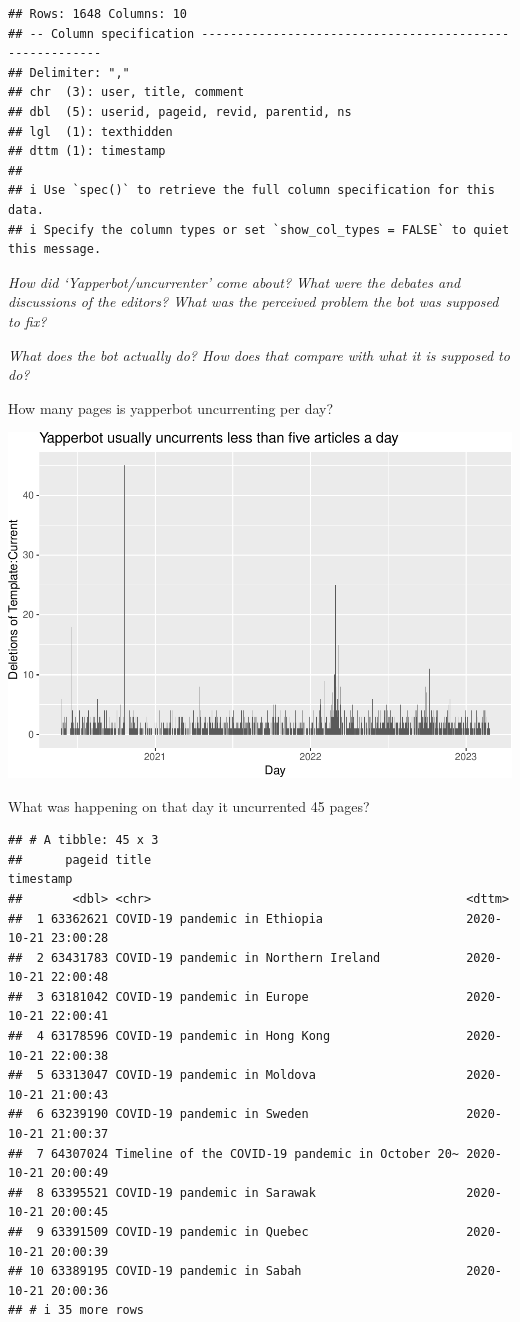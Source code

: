 \documentclass[Royal,times,sageh]{sagej}
\begin{document}
\begin{verbatim}
## Rows: 1648 Columns: 10
## -- Column specification --------------------------------------------------------
## Delimiter: ","
## chr  (3): user, title, comment
## dbl  (5): userid, pageid, revid, parentid, ns
## lgl  (1): texthidden
## dttm (1): timestamp
## 
## i Use `spec()` to retrieve the full column specification for this data.
## i Specify the column types or set `show_col_types = FALSE` to quiet this message.
\end{verbatim}

\emph{How did `Yapperbot/uncurrenter' come about? What were the debates
and discussions of the editors? What was the perceived problem the bot
was supposed to fix?}

\emph{What does the bot actually do? How does that compare with what it
is supposed to do?}

How many pages is yapperbot uncurrenting per day?

\includegraphics[width=1\linewidth]{the-bot-that-makes-history_files/figure-latex/unnamed-chunk-3-1}

What was happening on that day it uncurrented 45 pages?

\begin{verbatim}
## # A tibble: 45 x 3
##      pageid title                                            timestamp          
##       <dbl> <chr>                                            <dttm>             
##  1 63362621 COVID-19 pandemic in Ethiopia                    2020-10-21 23:00:28
##  2 63431783 COVID-19 pandemic in Northern Ireland            2020-10-21 22:00:48
##  3 63181042 COVID-19 pandemic in Europe                      2020-10-21 22:00:41
##  4 63178596 COVID-19 pandemic in Hong Kong                   2020-10-21 22:00:38
##  5 63313047 COVID-19 pandemic in Moldova                     2020-10-21 21:00:43
##  6 63239190 COVID-19 pandemic in Sweden                      2020-10-21 21:00:37
##  7 64307024 Timeline of the COVID-19 pandemic in October 20~ 2020-10-21 20:00:49
##  8 63395521 COVID-19 pandemic in Sarawak                     2020-10-21 20:00:45
##  9 63391509 COVID-19 pandemic in Quebec                      2020-10-21 20:00:39
## 10 63389195 COVID-19 pandemic in Sabah                       2020-10-21 20:00:36
## # i 35 more rows
\end{verbatim}
\end{document}
